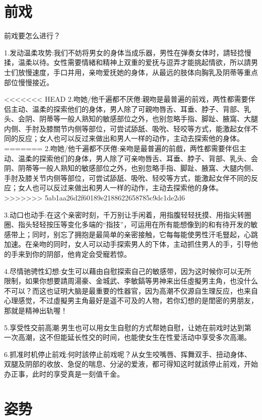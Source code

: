 \documentclass[12pt,UTF8]{ctexbook}
\begin{document}
\chapter{前戏}

前戏要怎么进行？

1.发动温柔攻势:我们不妨将男女的身体当成乐器，男性在弹奏女体时，請轻捻慢揉，温柔以待。女性需要情緒和精神上双重的爱抚与逗弄才能挑起情欲，所以請男士们放慢速度，手口并用，亲吻爱抚她的身体，从最远的肢体向胸乳及阴蒂等重点部位慢慢接近。

<<<<<<< HEAD
2.吻她/他千遍都不厌倦:親吻是最普遍的前戏，两性都需要伴侣主动、温柔的探索他们的身体，男人除了可親吻唇舌、耳垂、脖子、背部、乳头、会阴、阴蒂等一般人熟知的敏感部位之外，也别忽略手指、脚趾、腋窩、大腿内侧、手肘及膝關节内侧等部位，可尝试舔舐、吸吮、轻咬等方式，能激起女伴不同的反应；女人也可以反过来做出和男人一样的动作，主动去探索他的身体。
=======
2.吻她/他千遍都不厌倦:亲吻是最普遍的前戲，两性都需要伴侣主动、温柔的探索他们的身体，男人除了可亲吻唇舌、耳垂、脖子、背部、乳头、会阴、阴蒂等一般人熟知的敏感部位之外，也别忽略手指、脚趾、腋窩、大腿内侧、手肘及膝关节内侧等部位，可尝试舔舐、吸吮、轻咬等方式，能激起女伴不同的反应；女人也可以反过来做出和男人一样的动作，主动去探索他的身体。
>>>>>>> 5ab1aa26d2f60189e2188622658785c9dc1de2d6

3.动口也动手:在这个亲密时刻，千万别让手闲着，用指腹轻轻抚摸、用指尖转圈圈、指头轻轻按压等变化多端的“指技”，可运用在所有能想像到的和有待开发的敏感带上；同时，别忘了拥抱是最简单的亲密接触，它每每能使男性汗毛豎起，心跳加速。在亲吻的同时，女人可以动手探索男人的下体，主动抓住男人的手，引导他的手来到你的阴部，他肯定会受寵若惊。

4.尽情驰骋性幻想:女生可以藉由自慰探索自己的敏感带，因为这时候你可以无所限制，如果你想要請周湯豪、金城武、李敏鎬等男神来出任虛擬男主角，也没什么不可以？而这也证明大脑是最重要的性器官，因为高潮不仅源自生理反应，也来自心理感觉，不过虛擬男主角最好是遥不可及的人物，若你幻想的是閨密的男朋友，那就是精神出轨喔！

5.享受性交前高潮:男生也可以用女生自慰的方式帮她自慰，让她在前戏时达到第一次高潮，这不但能延长性交的时间，也能使女生在性爱活动中享受多次高潮。

6.抓准时机停止前戏:何时該停止前戏呢？从女生咬嘴唇、挥舞双手、扭动身体、双腿及阴部的收放、急促的喘息、分泌的爱液，都可得知这时就該停止前戏，开始办正事，此时的享受真是一刻值千金。


\chapter{姿势}
\end{document}
